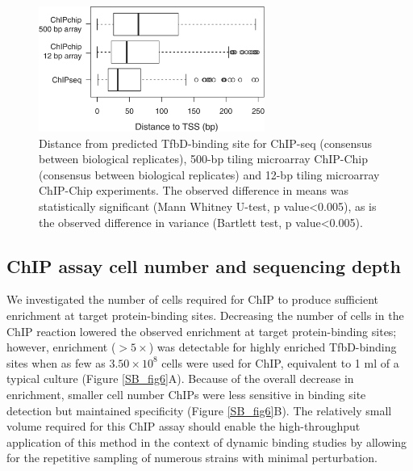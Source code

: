\begin{figure}
\centering
\includegraphics[width=20em]{SaltyBugs/figures/fig5}
\caption{Distance from predicted TfbD-binding site for ChIP-seq (consensus between biological replicates), 500-bp tiling microarray ChIP-Chip (consensus between biological replicates) and 12-bp tiling microarray ChIP-Chip experiments. The observed difference in means was statistically significant (Mann Whitney U-test, p value<0.005), as is the observed difference in variance (Bartlett test, p value<0.005).}
\label{SB_fig5}
\end{figure}

\subsection{ChIP assay cell number and sequencing depth}

We investigated the number of cells required for ChIP to produce sufficient enrichment at target protein-binding sites. Decreasing the number of cells in the ChIP reaction lowered the observed enrichment at target protein-binding sites; however, enrichment ($>5\times$) was detectable for highly enriched TfbD-binding sites when as few as $3.50 \times 10^8$ cells were used for ChIP, equivalent to 1 ml of a typical culture (Figure \ref{SB_fig6}A). Because of the overall decrease in enrichment, smaller cell number ChIPs were less sensitive in binding site detection but maintained specificity (Figure \ref{SB_fig6}B). The relatively small volume required for this ChIP assay should enable the high-throughput application of this method in the context of dynamic binding studies by allowing for the repetitive sampling of numerous strains with minimal perturbation.

